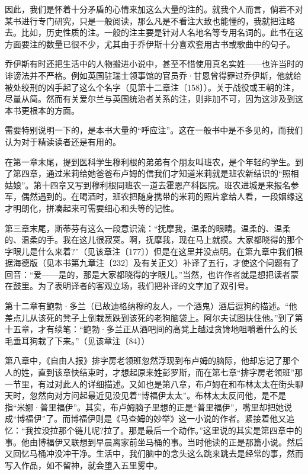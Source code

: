 \par 因此，我们是怀着十分矛盾的心情来加这么大量的注的。就我个人而言，倘若不对某书进行专门研究，只是一般阅读，那么凡是不看注大致也能懂的，我就把注略去。比如，历史性质的注。一般的注主要是针对人名地名等专用名词的。此书在这方面要注的数量已很不少，尤其由于乔伊斯十分喜欢套用古书或歌曲中的句子。
\par 乔伊斯有时还把生活中的人物搬进小说中，甚至不惜使用真名实姓——也许当时的诽谤法并不严格。例如英国驻瑞士领事馆的官员乔·甘恩曾得罪过乔伊斯，他就给被处绞刑的凶手起了这么个名字（见第十二章注〔158〕）。关于战役或王朝的注，尽量从简。然而有关爱尔兰与英国统治者关系的注，则非加不可，因为这涉及到这本书更根本的方面。
\par 需要特别说明一下的，是本书大量的“呼应注”。这在一般书中是不多见的，而我们认为对于精读读者还是有用的。
\par 在第一章末尾，提到医科学生穆利根的弟弟有个朋友叫班农，是个年轻的学生。到了第四章，通过米莉给她爸爸布卢姆的信我们才知道米莉就是班农新结识的“照相姑娘”。第十四章又写到穆利根同班农一道去霍恩产科医院。班农进城是来报名参军，偶然遇到的。在喝酒时，班农把随身携带的米莉的照片拿给人看，一段姻缘这才明朗化，拼凑起来可需要细心和头等的记性。
\par 第三章末尾，斯蒂芬有这么一段意识流：“抚摩我，温柔的眼睛。温柔的、温柔的、温柔的手。我在这儿很寂寞。啊，抚摩我，现在马上就摸。大家都晓得的那个字眼儿是什么来着?”（见该章注〔177〕）但是在这里并没点明。在第九章中我们根据海德版（见本书第九章注〔232〕及有关正文）补译了五行，才使这个问题有了回音：“爱——是的，那是大家都晓得的字眼儿。”当然，也许作者就是想把读者蒙在鼓里。为了表明译者的客观立场，我们把补译的文字加了双引号。
\par 第十二章有鲍勃·多兰（已故迪格纳穆的友人，一个酒鬼）酒后逗狗的描述。“他差点儿从该死的凳子上倒栽葱跌到该死的老狗脑袋上。阿尔夫试图扶住他。”到了第十五章，才有续笔：“鲍勃·多兰正从酒吧间的高凳上越过贪馋地咀嚼着什么的长毛垂耳狗栽了下来。”（见该章注〔84〕）
\par 第八章中，《自由人报》排字房老领班忽然浮现到布卢姆的脑际，他却忘记了那个人的姓，直到该章快结束时，才想起原来姓彭罗斯，而在第七章“排字房老领班”那一节里，有过对此人的详细描述。又如也是第八章，布卢姆在和布林太太在街头聊天时，忽然向对方问起最近见没见着“博福伊太太”。布林太太反问他，是不是指“米娜·普里福伊”。其实，布卢姆脑子里想的正是“普里福伊”，嘴里却把她说成“博福伊”了。而博福伊则是《马查姆的妙举》这一小说的作者。紧接着他又追忆：“我拉没拉那个链儿呢?拉了。那是最后一个动作。”这里说的其实是第四章中的事。他由博福伊又联想到早晨离家前坐马桶的事。当时他读的正是那篇小说。然后又回忆马桶冲没冲干净。生活中，我们脑中的念头这么跳来跳去是经常的事，然而写入作品，如不留神，就会堕入五里雾中。
